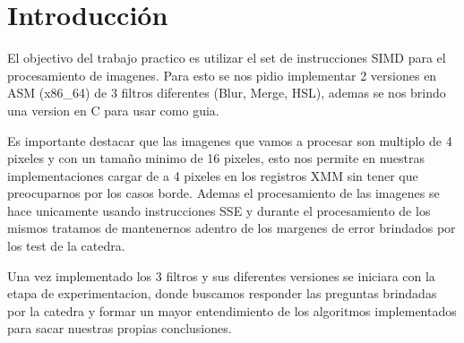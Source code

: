 \section{Introducción}

El objectivo del trabajo practico es utilizar el set de instrucciones SIMD para el procesamiento de imagenes.
Para esto se nos pidio implementar 2 versiones en ASM (x86\_64) de 3 filtros diferentes (Blur, Merge, HSL), ademas se nos brindo una version en C para usar como guia.

Es importante destacar que las imagenes que vamos a procesar son multiplo de 4 pixeles y con un tamaño minimo de 16 pixeles, esto nos permite en nuestras implementaciones cargar de a 4 pixeles en los registros XMM sin tener que preocuparnos por los casos borde.
Ademas el procesamiento de las imagenes se hace unicamente usando instrucciones SSE y durante el procesamiento de los mismos tratamos de mantenernos adentro de los margenes de error brindados por los test de la catedra.

Una vez implementado los 3 filtros y sus diferentes versiones se iniciara con la etapa de experimentacion, donde buscamos responder las preguntas brindadas por la catedra y formar un mayor entendimiento de los algoritmos implementados para sacar nuestras propias conclusiones.